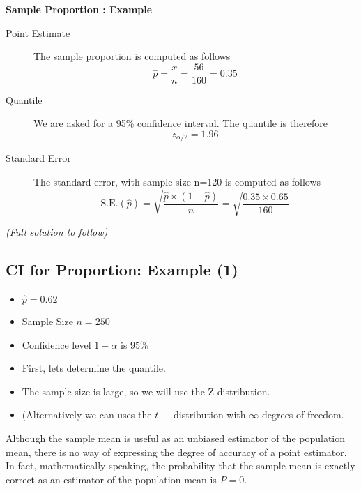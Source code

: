 \documentclass[]{report}
\begin{document}
\textbf{ Sample Proportion : Example}


\begin{description}
\item [Point Estimate] The sample proportion is computed as follows
\[ \hat{p} = \frac{x}{n} = \frac{56}{160} = 0.35\]
\item [Quantile] We are asked for a 95\% confidence interval. The quantile is therefore
\[ z_{\alpha/2} =1.96\]
\item [Standard Error] The standard error, with sample size n=120 is computed as follows
\[ \mbox{S.E.}(\hat{p}) = \sqrt{\frac{\hat{p} \times (1-\hat{p})}{n}} =  \sqrt{\frac{0.35 \times 0.65}{160}}\]

\end{description}
\noindent\textit{(Full solution to follow)}
\newpage




\subsection{CI for Proportion: Example (1)}

\begin{itemize}
\item $\hat{p}  = 0.62$
\item Sample Size $n=250$
\item Confidence level $1-\alpha$ is $95\%$
\end{itemize}




\begin{itemize}
\item First, lets determine the quantile.
\item The sample size is large, so we will use the Z distribution.
\item (Alternatively we can uses the $t-$ distribution with $\infty$ degrees of freedom.
\end{itemize}





Although the sample mean is useful as an unbiased estimator of the population mean, there is no way of
expressing the degree of accuracy of a point estimator. In fact, mathematically speaking, the probability that the
sample mean is exactly correct as an estimator of the population mean is $P = 0$.
\end{document}
